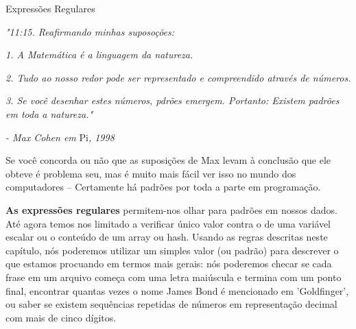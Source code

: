 \documentclass[a4paper,11pt]{book}
\begin{document}

\noindent 

\noindent 

\noindent 

\noindent 

\noindent 

\noindent 

\noindent 

\noindent 

\noindent 

\noindent 

\noindent 

\noindent 

\noindent 

\noindent 

\noindent 

\noindent Express\~oes Regulares

\noindent 

\noindent 

\noindent 

\noindent 

\noindent \textit{"11:15. Reafirmando minhas suposoções:}

\noindent 

\noindent \textit{1. A Matemática é a linguagem da natureza.}

\noindent \textit{2. Tudo ao nosso redor pode ser representado e compreendido através de números.}

\noindent \textit{3. Se você desenhar estes números, pdrões emergem. Portanto: Existem padrões em toda a natureza."}

\noindent 

\noindent \textit{- Max Cohen em }Pi\textit{, 1998}

\noindent 

\noindent Se você concorda ou não que as suposições de Max levam à conclusão que ele obteve é problema seu, mas é muito mais fácil ver isso no mundo dos computadores -- Certamente há padrões por toda a parte em programação.

\noindent 

\noindent \textbf{As expressões regulares} permitem-nos olhar para padrões em nossos dados. Até agora temos nos limitado a verificar único valor contra o de uma variável escalar ou o conteúdo de um array ou hash. Usando as regras descritas neste capítulo, nós poderemos utilizar um simples valor (ou padrão) para descrever o que estamos procuando em termos mais gerais: nós poderemos checar se cada frase em um arquivo começa com uma letra maiúscula e termina com um ponto final, encontrar quantas vezes o nome James Bond é mencionado em 'Goldfinger', ou saber se existem sequências repetidas de números em representação decimal com mais de cinco dígitos.
\end{document}
